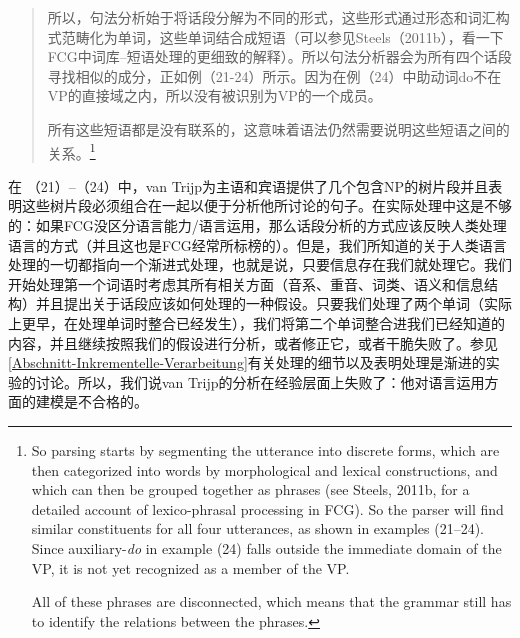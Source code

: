\begin{quotation}
所以，句法分析始于将话段分解为不同的形式，这些形式通过形态和词汇构式范畴化为单词，这些单词结合成短语（可以参见Steels（2011b），看一下FCG中词库--短语处理的更细致的解释）。所以句法分析器会为所有四个话段寻找相似的成分，正如例（21-24）所示。因为在例（24）中助动词do不在VP的直接域之内，所以没有被识别为VP的一个成员。

所有这些短语都是没有联系的，这意味着语法仍然需要说明这些短语之间的关系。\citep[]{vanTrijp2014a}\footnote{
So parsing starts by segmenting the utterance
into discrete forms, which are then categorized into words by morphological
and lexical constructions, and which can then be grouped together as
phrases (see Steels, 2011b, for a detailed account of lexico-phrasal
processing in FCG). So the parser will find similar constituents for all
four utterances, as shown in examples (21--24). Since auxiliary-\emph{do} in
example (24) falls outside the immediate domain of the VP, it is not yet
recognized as a member of the VP.

All of these phrases are disconnected, which means that the grammar
still has to identify the relations between the phrases. 
}
\end{quotation}
在 （21）--（24）中，van Trijp为主语和宾语提供了几个包含NP的树片段并且表明这些树片段必须组合在一起以便于分析他所讨论的句子。在实际处理中这是不够的：如果FCG没区分语言能力/语言运用，那么话段分析的方式应该反映人类处理语言的方式（并且这也是FCG经常所标榜的）。但是，我们所知道的关于人类语言处理的一切都指向一个渐进式处理，也就是说，只要信息存在我们就处理它。我们开始处理第一个词语时考虑其所有相关方面（音系、重音、词类、语义和信息结构）并且提出关于话段应该如何处理的一种假设。只要我们处理了两个单词（实际上更早，在处理单词时整合已经发生），我们将第二个单词整合进我们已经知道的内容，并且继续按照我们的假设进行分析，或者修正它，或者干脆失败了。参见\ref{Abschnitt-Inkrementelle-Verarbeitung}有关处理的细节以及表明处理是渐进的实验的讨论。所以，我们说van Trijp的分析在经验层面上失败了：他对语言运用方面的建模是不合格的。

